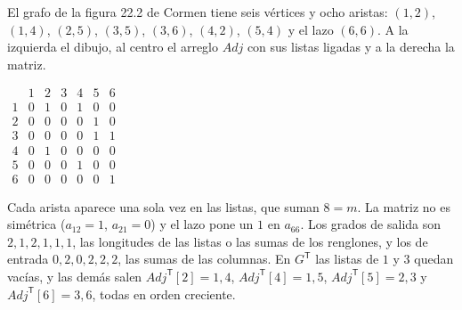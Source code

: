 \documentclass[11pt,letterpaper]{article}
\begin{document}
\begin{ejemplo}
  \label{ej:busq-dirigido-cormen}
  El grafo de la figura 22.2 de Cormen tiene seis vértices y ocho
  aristas: $(1,2)$, $(1,4)$, $(2,5)$, $(3,5)$, $(3,6)$, $(4,2)$,
  $(5,4)$ y el lazo $(6,6)$. A la izquierda el dibujo, al centro el
  arreglo $\mathit{Adj}$ con sus listas ligadas y a la derecha la
  matriz.
  \begin{center}
  \hspace{0.7cm}
  \hspace{0.7cm}
  $\begin{array}{c|cccccc}
      & 1 & 2 & 3 & 4 & 5 & 6 \\ \hline
    1 & 0 & 1 & 0 & 1 & 0 & 0 \\
    2 & 0 & 0 & 0 & 0 & 1 & 0 \\
    3 & 0 & 0 & 0 & 0 & 1 & 1 \\
    4 & 0 & 1 & 0 & 0 & 0 & 0 \\
    5 & 0 & 0 & 0 & 1 & 0 & 0 \\
    6 & 0 & 0 & 0 & 0 & 0 & 1
  \end{array}$
  \end{center}
  Cada arista aparece una sola vez en las listas, que suman $8 = m$.
  La matriz no es simétrica ($a_{12} = 1$, $a_{21} = 0$) y el lazo
  pone un $1$ en $a_{66}$. Los grados de salida son
  $2, 1, 2, 1, 1, 1$, las longitudes de las listas o las sumas de los
  renglones, y los de entrada $0, 2, 0, 2, 2, 2$, las sumas de las
  columnas. En $G^{\mathsf{T}}$ las listas de $1$ y $3$ quedan vacías,
  y las demás salen $\mathit{Adj}^{\mathsf{T}}[2] = 1, 4$,
  $\mathit{Adj}^{\mathsf{T}}[4] = 1, 5$,
  $\mathit{Adj}^{\mathsf{T}}[5] = 2, 3$ y
  $\mathit{Adj}^{\mathsf{T}}[6] = 3, 6$, todas en orden creciente.
\end{ejemplo}
\end{document}
